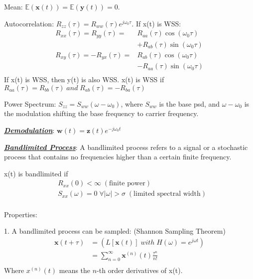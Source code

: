 \documentclass[12pt]{article}
\newcommand{\bulletPoint}[1]{\ul{\textit{\textbf{#1}}}}
\begin{document}
\begin{multicols*}{4}
Mean: $\mathbb{E}(\mathbf{x}(t)) = \mathbb{E}(\mathbf{y}(t)) = 0$.

Autocorrelation: $R_{zz}(\tau) = R_{ww}(\tau)e^{j\omega_0\tau}$. If x(t) is WSS:
\useshortskip \begin{equation*}
    \begin{split}
        R_{xx}(\tau)= R_{yy}(\tau) = & R_{aa}(\tau)\cos(\omega_0\tau) \\
        & + R_{ab}(\tau)\sin(\omega_0\tau) \\
        R_{xy}(\tau) = -R_{yx}(\tau) = &  R_{ab}(\tau)\cos(\omega_0\tau) \\
        & - R_{aa}(\tau)\sin(\omega_0\tau)\\[-5pt]
    \end{split}
\end{equation*}
If x(t) is WSS, then y(t) is also WSS. x(t) is WSS if $R_{aa}(\tau) = R_{bb}(\tau) \; and \; R_{ab}(\tau) = -R_{ba}(\tau)$

Power Spectrum: $S_{zz} = S_{ww}(\omega - \omega_0)$, where $S_{ww}$ is the base psd, and $\omega - \omega_0$ is the modulation shifting the base frequency to carrier frequency.


\bulletPoint{Demodulation}: $\mathbf{w}(t) = \mathbf{z}(t)e^{-j\omega_0t}$


\bulletPoint{Bandlimited Process}: A bandlimited process refers to a signal or a stochastic process that contains no frequencies higher than a certain finite frequency. 

x(t) is bandlimited if
\useshortskip \begin{equation*}
    \begin{split}
        & R_{xx}(0) < \infty \; (\text{finite power})\\
        & S_{xx}(\omega) = 0 \; \forall |\omega|>\sigma \; (\text{limited spectral width})\\[-5pt]
    \end{split}
\end{equation*}

Properties: 

1. A bandlimited process can be sampled: (Shannon Sampling Theorem)
\useshortskip \begin{equation*}
    \begin{split}
        \mathbf{x}(t+\tau) & = (L[\mathbf{x}(t)] \; with \; H(\omega) = e^{j\omega t}) \\[-3pt]
        & = \sum^{\infty}_{n=0}\mathbf{x}^{(n)}(t)\frac{\tau^n}{n!}\\[-8pt]
    \end{split}
\end{equation*}
Where $x^{(n)}(t)$ means the $n$-th order derivatives of x(t).


\end{multicols*}
\end{document}
